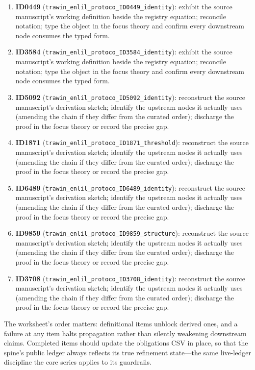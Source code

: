 \documentclass[11pt]{article}
\theoremstyle{remark}
\begin{document}
\begin{enumerate}
\item \textbf{ID0449} (\texttt{trawin\_enlil\_protoco\_ID0449\_identity}): exhibit the source manuscript's working definition beside the registry equation; reconcile notation; type the object in the focus theory and confirm every downstream node consumes the typed form.
\item \textbf{ID3584} (\texttt{trawin\_enlil\_protoco\_ID3584\_identity}): exhibit the source manuscript's working definition beside the registry equation; reconcile notation; type the object in the focus theory and confirm every downstream node consumes the typed form.
\item \textbf{ID5092} (\texttt{trawin\_enlil\_protoco\_ID5092\_identity}): reconstruct the source manuscript's derivation sketch; identify the upstream nodes it actually uses (amending the chain if they differ from the curated order); discharge the proof in the focus theory or record the precise gap.
\item \textbf{ID1871} (\texttt{trawin\_enlil\_protoco\_ID1871\_threshold}): reconstruct the source manuscript's derivation sketch; identify the upstream nodes it actually uses (amending the chain if they differ from the curated order); discharge the proof in the focus theory or record the precise gap.
\item \textbf{ID6489} (\texttt{trawin\_enlil\_protoco\_ID6489\_identity}): reconstruct the source manuscript's derivation sketch; identify the upstream nodes it actually uses (amending the chain if they differ from the curated order); discharge the proof in the focus theory or record the precise gap.
\item \textbf{ID9859} (\texttt{trawin\_enlil\_protoco\_ID9859\_structure}): reconstruct the source manuscript's derivation sketch; identify the upstream nodes it actually uses (amending the chain if they differ from the curated order); discharge the proof in the focus theory or record the precise gap.
\item \textbf{ID3708} (\texttt{trawin\_enlil\_protoco\_ID3708\_identity}): reconstruct the source manuscript's derivation sketch; identify the upstream nodes it actually uses (amending the chain if they differ from the curated order); discharge the proof in the focus theory or record the precise gap.
\end{enumerate}

The worksheet's order matters: definitional items unblock derived ones, and a failure at any item halts propagation rather than silently weakening downstream claims. Completed items should update the obligations CSV in place, so that the spine's public ledger always reflects its true refinement state---the same live-ledger discipline the core series applies to its guardrails.
\end{document}
